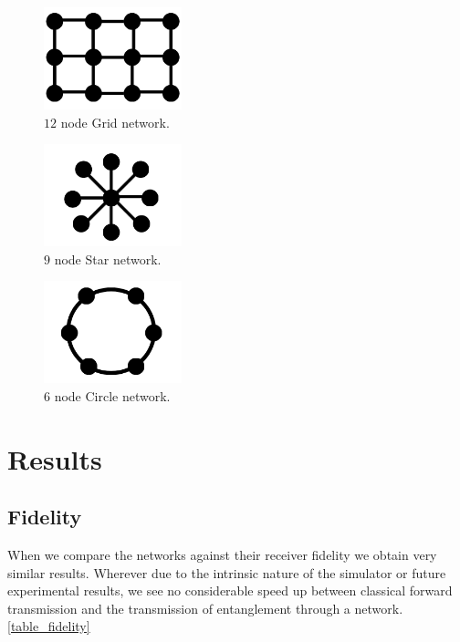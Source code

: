 \documentclass{article}
\begin{document}
    \begin{figure}
    \centering
    \includegraphics[width=4cm]{Grid.png}
    \caption{$12$ node Grid network. \label{f2}} 
    \end{figure}

    \begin{figure}
    \centering
    \includegraphics[width=4cm]{Star.png}
    \caption{$9$ node Star network. \label{f3}} 
    \end{figure}

    \begin{figure}
    \centering
    \includegraphics[width=4cm]{Circle.png}
    \caption{$6$ node Circle network. \label{f4}} 
    \end{figure}

    \section{Results}

    \subsection*{Fidelity}
    When we compare the networks against their receiver fidelity we obtain very similar results. Wherever due to the intrinsic nature of the simulator or future experimental results, we see no considerable speed up between classical forward transmission and the transmission of entanglement through a network. \ref{table_fidelity} 
    
\end{document}
